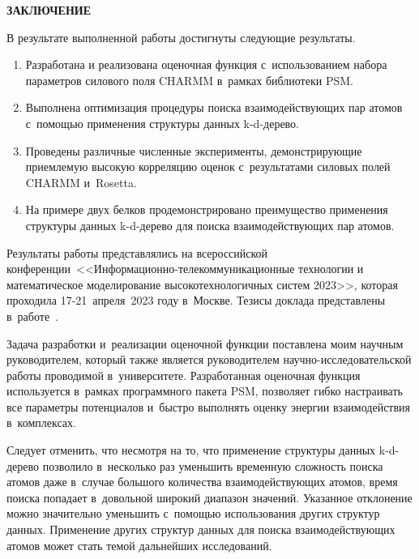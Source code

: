 \newpage
\begin{center}
  \textbf{\large ЗАКЛЮЧЕНИЕ}
\end{center}


В результате выполненной работы достигнуты следующие результаты.
\vspace{-10pt}
\begin{enumerate}
	\setlength{\itemsep}{0pt}
	\setlength{\parskip}{0pt}	
	\item Разработана и реализована оценочная функция с~использованием набора параметров силового поля CHARMM в~рамках библиотеки PSM. 
	\item Выполнена оптимизация процедуры поиска взаимодействующих пар атомов с~помощью применения структуры данных k-d-дерево.
	\item Проведены различные численные эксперименты, демонстрирующие приемлемую высокую корреляцию оценок с~результатами силовых полей CHARMM и~Rosetta.
	\item На примере двух белков продемонстрировано преимущество применения структуры данных k-d-дерево для поиска взаимодействующих пар атомов.
\end{enumerate}
\vspace{-10pt}

Результаты работы представлялись на всероссийской конференции~<<Информационно-телекоммуникационные технологии и математическое моделирование высокотехнологичных систем 2023>>, которая проходила 17-21~апреля~2023 году в~Москве. Тезисы доклада представлены в~работе~\cite{rudn}.

Задача разработки и~реализации оценочной функции поставлена моим научным руководителем, который также является руководителем научно-исследовательской работы проводимой в~университете. Разработанная оценочная функция используется в~рамках программного пакета PSM, позволяет гибко настраивать все параметры потенциалов и~быстро выполнять оценку энергии взаимодействия в~комплексах. 

Следует отменить, что несмотря на то, что применение структуры данных k-d-дерево позволило в~несколько раз уменьшить временную сложность поиска атомов даже в~случае большого количества взаимодействующих атомов, время поиска попадает в~довольной широкий диапазон значений. Указанное отклонение можно значительно уменьшить с~помощью использования других структур данных. Применение других структур данных для поиска взаимодействующих атомов может стать темой дальнейших исследований.